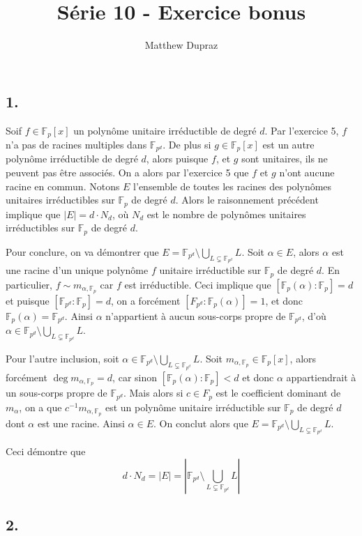 \documentclass{article}
\author{Matthew Dupraz}
\title{Série 10 - Exercice bonus}
\newcommand{\F}{\mathbb{F}}
\begin{document}
\maketitle

\subsection*{1.}

Soif $f \in \F_p[x]$ un polynôme unitaire irréductible de
degré $d$. Par l'exercice 5, $f$ n'a pas de racines multiples
dans $\F_{p^d}$.
De plus si $g \in \F_p[x]$ est un autre polynôme irréductible
de degré $d$, alors puisque $f$, et $g$ sont unitaires, ils ne
peuvent pas être associés. On a alors par l'exercice 5 que
$f$ et $g$ n'ont aucune racine en commun. Notons $E$ l'ensemble
de toutes les racines des polynômes unitaires irréductibles
sur $\F_p$ de degré $d$.
Alors le raisonnement précédent implique que
$|E| = d\cdot N_d$, où $N_d$ est le nombre de polynômes unitaires
irréductibles sur $\F_p$ de degré $d$.

Pour conclure, on va démontrer que $E = \F_{p^d} \setminus
\bigcup_{L \subsetneq \F_{p^d}}L$.
Soit $\alpha \in E$, alors $\alpha$ est une racine d'un unique
polynôme $f$ unitaire irréductible sur $\F_p$ de degré $d$.
En particulier, $f \sim m_{\alpha, \F_p}$ car $f$ est
irréductible. Ceci implique que 
$[\F_p(\alpha):\F_p] = d$ et puisque
$[\F_{p^d} : \F_p] = d$, on a forcément
$[F_{p^d}:\F_{p}(\alpha)] = 1$,
et donc $\F_p(\alpha) = \F_{p^d}$.
Ainsi $\alpha$ n'appartient à aucun sous-corps propre de $\F_{p^d}$,
d'où $\alpha \in \F_{p^d} \setminus
\bigcup_{L \subsetneq \F_{p^d}}L$. 

Pour l'autre inclusion, soit $\alpha \in \F_{p^d}\setminus
\bigcup_{L \subsetneq \F_{p^d}}L$.
Soit $m_{\alpha, \F_p} \in \F_p[x]$,
alors forcément $\deg m_{\alpha, \F_p} = d$,
car sinon $[\F_p(\alpha): \F_p] < d$ et donc $\alpha$ appartiendrait
à un sous-corps propre de $\F_{p^d}$. Mais alors si $c \in F_p$ est
le coefficient dominant de $m_\alpha$, on a que
$c^{-1}m_{\alpha, \F_p}$ est un polynôme unitaire irréductible
sur $\F_p$ de degré $d$ dont $\alpha$ est une racine.
Ainsi $\alpha \in E$. On conclut alors que $E = \F_{p^d}\setminus
\bigcup_{L \subsetneq \F_{p^d}}L$.

Ceci démontre que
\begin{equation*}	
	d\cdot N_d = |E| = |\F_{p^d}\setminus
	\bigcup_{L \subsetneq \F_{p^d}}L|
\end{equation*}

\subsection*{2.}
\end{document}
